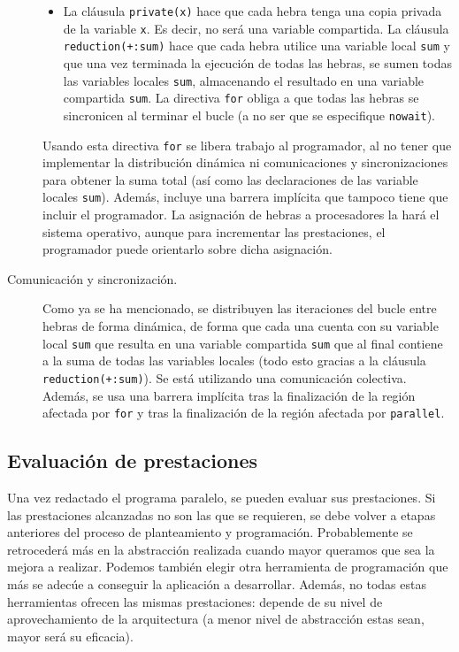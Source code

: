 \begin{description}
\begin{itemize}
            \item La cláusula \verb|private(x)| hace que cada hebra tenga una copia privada de la variable \verb|x|. Es decir, no será una variable compartida. La cláusula \verb|reduction(+:sum)| hace que cada hebra utilice una variable local \verb|sum| y que una vez terminada la ejecución de todas las hebras, se sumen todas las variables locales \verb|sum|, almacenando el resultado en una variable compartida \verb|sum|. La directiva \verb|for| obliga a que todas las hebras se sincronicen al terminar el bucle (a no ser que se especifique \verb|nowait|).
        \end{itemize}
        Usando esta directiva \verb|for| se libera trabajo al programador, al no tener que implementar la distribución dinámica ni comunicaciones y sincronizaciones para obtener la suma total (así como las declaraciones de las variable locales \verb|sum|). Además, incluye una barrera implícita que tampoco tiene que incluir el programador. La asignación de hebras a procesadores la hará el sistema operativo, aunque para incrementar las prestaciones, el programador puede orientarlo sobre dicha asignación.
    \item [Comunicación y sincronización.] 
        Como ya se ha mencionado, se distribuyen las iteraciones del bucle entre hebras de forma dinámica, de forma que cada una cuenta con su variable local \verb|sum| que resulta en una variable compartida \verb|sum| que al final contiene a la suma de todas las variables locales (todo esto gracias a la cláusula \verb|reduction(+:sum)|). Se está utilizando una comunicación colectiva. Además, se usa una barrera implícita tras la finalización de la región afectada por \verb|for| y tras la finalización de la región afectada por \verb|parallel|.
\end{description}

\subsection{Evaluación de prestaciones}
Una vez redactado el programa paralelo, se pueden evaluar sus prestaciones. Si las prestaciones alcanzadas no son las que se requieren, se debe volver a etapas anteriores del proceso de planteamiento y programación. Probablemente se retrocederá más en la abstracción realizada cuando mayor queramos que sea la mejora a realizar. Podemos también elegir otra herramienta de programación que más se adecúe a conseguir la aplicación a desarrollar. Además, no todas estas herramientas ofrecen las mismas prestaciones: depende de su nivel de aprovechamiento de la arquitectura (a menor nivel de abstracción estas sean, mayor será su eficacia).

